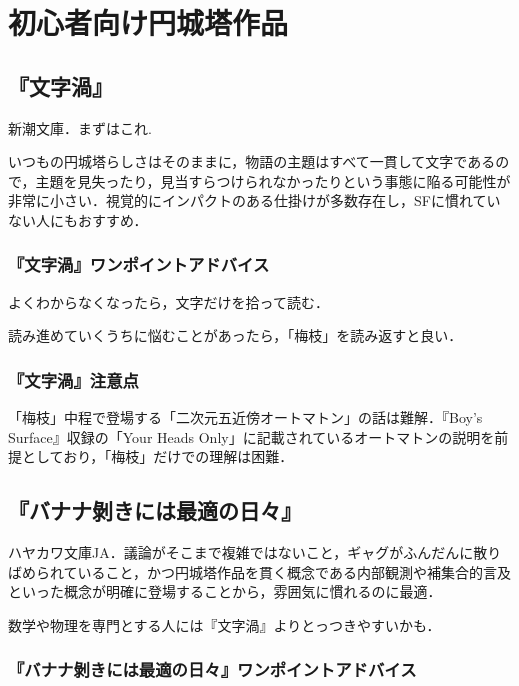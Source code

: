 \documentclass[10pt, a5paper, twoside]{jsarticle}
\begin{document}
	\section{初心者向け円城塔作品}

		\subsection{『文字渦』}
			
			新潮文庫．まずはこれ.

			いつもの円城塔らしさはそのままに，物語の主題はすべて一貫して文字であるので，主題を見失ったり，見当すらつけられなかったりという事態に陥る可能性が非常に小さい．視覚的にインパクトのある仕掛けが多数存在し，SFに慣れていない人にもおすすめ．

			\subsubsection*{『文字渦』ワンポイントアドバイス}

				よくわからなくなったら，文字だけを拾って読む．

				読み進めていくうちに悩むことがあったら，「梅枝」を読み返すと良い．

			\subsubsection*{『文字渦』注意点}

				「梅枝」中程で登場する「二次元五近傍オートマトン」の話は難解．『Boy's Surface』収録の「Your Heads Only」に記載されているオートマトンの説明を前提としており，「梅枝」だけでの理解は困難．

		\subsection{『バナナ剝きには最適の日々』}
		
			ハヤカワ文庫JA．議論がそこまで複雑ではないこと，ギャグがふんだんに散りばめられていること，かつ円城塔作品を貫く概念である内部観測や補集合的言及といった概念が明確に登場することから，雰囲気に慣れるのに最適．

			数学や物理を専門とする人には『文字渦』よりとっつきやすいかも．

			\subsubsection*{『バナナ剝きには最適の日々』ワンポイントアドバイス}
\end{document}
